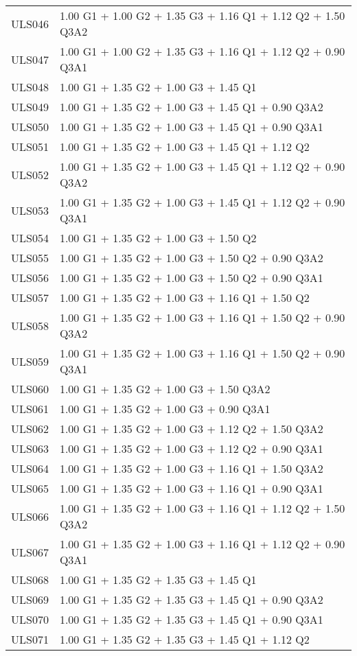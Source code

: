 \begin{center}
\begin{small}
\begin{longtable}{|l|p{10cm}|}
ULS046 & 1.00 G1 + 1.00 G2 + 1.35 G3 + 1.16 Q1 + 1.12 Q2 + 1.50 Q3A2\\
ULS047 & 1.00 G1 + 1.00 G2 + 1.35 G3 + 1.16 Q1 + 1.12 Q2 + 0.90 Q3A1\\
ULS048 & 1.00 G1 + 1.35 G2 + 1.00 G3 + 1.45 Q1\\
ULS049 & 1.00 G1 + 1.35 G2 + 1.00 G3 + 1.45 Q1 + 0.90 Q3A2\\
ULS050 & 1.00 G1 + 1.35 G2 + 1.00 G3 + 1.45 Q1 + 0.90 Q3A1\\
ULS051 & 1.00 G1 + 1.35 G2 + 1.00 G3 + 1.45 Q1 + 1.12 Q2\\
ULS052 & 1.00 G1 + 1.35 G2 + 1.00 G3 + 1.45 Q1 + 1.12 Q2 + 0.90 Q3A2\\
ULS053 & 1.00 G1 + 1.35 G2 + 1.00 G3 + 1.45 Q1 + 1.12 Q2 + 0.90 Q3A1\\
ULS054 & 1.00 G1 + 1.35 G2 + 1.00 G3 + 1.50 Q2\\
ULS055 & 1.00 G1 + 1.35 G2 + 1.00 G3 + 1.50 Q2 + 0.90 Q3A2\\
ULS056 & 1.00 G1 + 1.35 G2 + 1.00 G3 + 1.50 Q2 + 0.90 Q3A1\\
ULS057 & 1.00 G1 + 1.35 G2 + 1.00 G3 + 1.16 Q1 + 1.50 Q2\\
ULS058 & 1.00 G1 + 1.35 G2 + 1.00 G3 + 1.16 Q1 + 1.50 Q2 + 0.90 Q3A2\\
ULS059 & 1.00 G1 + 1.35 G2 + 1.00 G3 + 1.16 Q1 + 1.50 Q2 + 0.90 Q3A1\\
ULS060 & 1.00 G1 + 1.35 G2 + 1.00 G3 + 1.50 Q3A2\\
ULS061 & 1.00 G1 + 1.35 G2 + 1.00 G3 + 0.90 Q3A1\\
ULS062 & 1.00 G1 + 1.35 G2 + 1.00 G3 + 1.12 Q2 + 1.50 Q3A2\\
ULS063 & 1.00 G1 + 1.35 G2 + 1.00 G3 + 1.12 Q2 + 0.90 Q3A1\\
ULS064 & 1.00 G1 + 1.35 G2 + 1.00 G3 + 1.16 Q1 + 1.50 Q3A2\\
ULS065 & 1.00 G1 + 1.35 G2 + 1.00 G3 + 1.16 Q1 + 0.90 Q3A1\\
ULS066 & 1.00 G1 + 1.35 G2 + 1.00 G3 + 1.16 Q1 + 1.12 Q2 + 1.50 Q3A2\\
ULS067 & 1.00 G1 + 1.35 G2 + 1.00 G3 + 1.16 Q1 + 1.12 Q2 + 0.90 Q3A1\\
ULS068 & 1.00 G1 + 1.35 G2 + 1.35 G3 + 1.45 Q1\\
ULS069 & 1.00 G1 + 1.35 G2 + 1.35 G3 + 1.45 Q1 + 0.90 Q3A2\\
ULS070 & 1.00 G1 + 1.35 G2 + 1.35 G3 + 1.45 Q1 + 0.90 Q3A1\\
ULS071 & 1.00 G1 + 1.35 G2 + 1.35 G3 + 1.45 Q1 + 1.12 Q2\\

\end{longtable}
\end{small}
\end{center}
